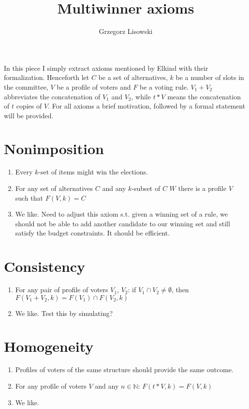 \documentclass{article}
\title{Multiwinner axioms}
\author{Grzegorz Lisowski}
\begin{document}
\maketitle
In this piece I simply extract axioms mentioned by Elkind with their formalization. Henceforth let $C$ be a set of alternatives, $k$ be a number of slots in the committee, $V$ be a profile of voters and $F$ be a voting rule. $V_1 + V_2$ abbreviates the concatenation of $V_1$ and $V_2$, while $t*V$ means the concatenation of $t$ copies of $V$. For all axioms a brief motivation, followed by a formal statement will be provided.
\section{Nonimposition}
\begin{enumerate}
\item Every $k$-set of items might win the elections.
\item For any set of alternatives $C$ and any $k$-subset of $C$ $W$ there is a profile $V$ such that $F(V, k)=C$
\item We like. Need to adjust this axiom s.t. given a winning set of a rule, we should not be able to add another candidate to our winning set and still satisfy the budget constraints. It should be efficient.
\end{enumerate}

\section{Consistency}
\begin{enumerate}
\item For any pair of profile of voters $V_1$, $V_2$: if $V_1 \cap V_2 \neq \emptyset$, then $F(V_1+V_2, k)=F(V_1) \cap F(V_2, k)$
\item We like. Test this by simulating?
\end{enumerate}

\section{Homogeneity}
\begin{enumerate}
\item Profiles of voters of the same structure should provide the same outcome.
\item For any profile of voters $V$ and any $n \in \mathbb{N}$: $F(t*V, k)=F(V, k)$
\item We like.
\end{enumerate}
\end{document}
